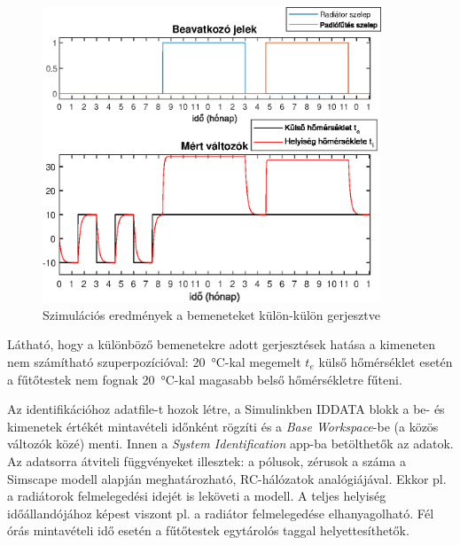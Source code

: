 \begin{figure}[H]
	\centering
	\includegraphics[trim=0 0 0 0, clip,width=0.9\textwidth]{figures/valve-step-hot}
	\caption{Szimulációs eredmények a bemeneteket külön-külön gerjesztve}
	\label{fig:valve-step-hot}
\end{figure}

Látható, hogy a különböző bemenetekre adott gerjesztések hatása a kimeneten nem számítható szuperpozícióval: \SI{20}{\celsius}-kal megemelt $t_e$ külső hőmérséklet esetén a fűtőtestek nem fognak \SI{20}{\celsius}-kal magasabb belső hőmérsékletre fűteni.



Az identifikációhoz adatfile-t hozok létre, a Simulinkben IDDATA blokk a be- és kimenetek értékét mintavételi időnként rögzíti és a \textit{Base Workspace}-be (a közös változók közé) menti. Innen a \textit{System Identification} app-ba betölthetők az adatok. %
Az adatsorra átviteli függvényeket illesztek: a pólusok, zérusok a száma a Simscape modell alapján meghatározható, RC-hálózatok analógiájával. Ekkor pl. a radiátorok felmelegedési idejét is leköveti a modell. A teljes helyiség időállandójához képest viszont pl. a radiátor felmelegedése elhanyagolható. Fél órás mintavételi idő esetén a fűtőtestek egytárolós taggal helyettesíthetők. 




